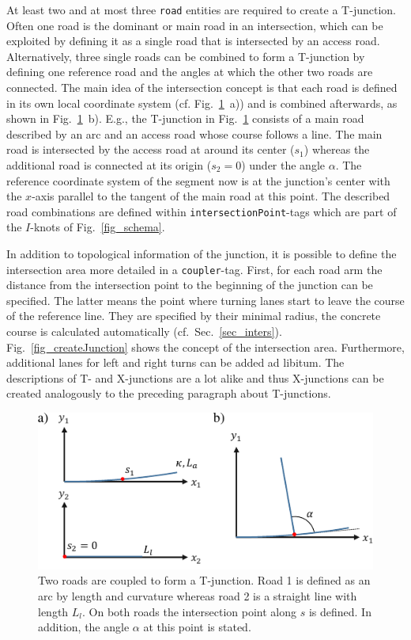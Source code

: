 \documentclass[a4paper, 10pt, conference]{ieeeconf}      %
\begin{document}
At least two and at most three \texttt{road} entities are required to create a T-junction. Often one road is the dominant or main road in an intersection, which can be exploited by defining it as a single road that is intersected by an access road. Alternatively, three single roads can be combined to form a T-junction by defining one reference road and the angles at which the other two roads are connected. The main idea of the intersection concept is that each road is defined in its own local coordinate system (cf. Fig.~\ref{fig_juncDef}~a)) and is combined afterwards, as shown in Fig.~\ref{fig_juncDef}~b). E.g., the T-junction in Fig.~\ref{fig_juncDef} consists of a main road described by an arc and an access road whose course follows a line. The main road is intersected by the access road at around its center ($s_1$) whereas the additional road is connected at its origin ($s_2=0$) under the angle $\alpha$. The reference coordinate system of the segment now is at the junction's center with the $x$-axis parallel to the tangent of the main road at this point. The described road combinations are defined within \texttt{intersectionPoint}-tags which are part of the $I$-knots of Fig.~\ref{fig_schema}.

In addition to topological information of the junction, it is possible to define the intersection area more detailed in a \texttt{coupler}-tag. First, for each road arm the distance from the intersection point to the beginning of the junction can be specified. The latter means the point where turning lanes start to leave the course of the reference line. They are specified by their minimal radius, the concrete course is calculated automatically (cf.~Sec.~\ref{sec_inters}). Fig.~\ref{fig_createJunction} shows the concept of the intersection area. Furthermore, additional lanes for left and right turns can be added ad libitum. The descriptions of T- and X-junctions are a lot alike and thus X-junctions can be created analogously to the preceding paragraph about T-junctions.
\begin{figure}[thpb] 		
	\centering
	\includegraphics{fig/junctionDef.pdf}	
	\caption{Two roads are coupled to form a T-junction. Road 1 is defined as an arc by length and curvature whereas road 2 is a straight line with length $L_l$. On both roads the intersection point along $s$ is defined. In addition, the angle $\alpha$ at this point is stated. }
	\label{fig_juncDef}
\end{figure}
\end{document}
